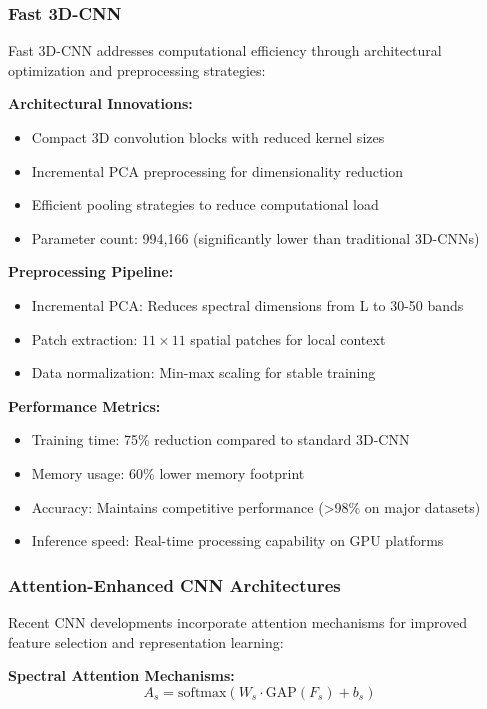 \documentclass[journal]{IEEEtran}
\begin{document}
\subsubsection{Fast 3D-CNN}

Fast 3D-CNN \cite{ahmad2021fast} addresses computational efficiency through architectural optimization and preprocessing strategies:

\textbf{Architectural Innovations:}
\begin{itemize}
\item Compact 3D convolution blocks with reduced kernel sizes
\item Incremental PCA preprocessing for dimensionality reduction
\item Efficient pooling strategies to reduce computational load
\item Parameter count: 994,166 (significantly lower than traditional 3D-CNNs)
\end{itemize}

\textbf{Preprocessing Pipeline:}
\begin{itemize}
\item Incremental PCA: Reduces spectral dimensions from L to 30-50 bands
\item Patch extraction: $11 \times 11$ spatial patches for local context
\item Data normalization: Min-max scaling for stable training
\end{itemize}

\textbf{Performance Metrics:}
\begin{itemize}
\item Training time: 75\% reduction compared to standard 3D-CNN
\item Memory usage: 60\% lower memory footprint
\item Accuracy: Maintains competitive performance (>98\% on major datasets)
\item Inference speed: Real-time processing capability on GPU platforms
\end{itemize}

\subsubsection{Attention-Enhanced CNN Architectures}

Recent CNN developments incorporate attention mechanisms for improved feature selection and representation learning:

\textbf{Spectral Attention Mechanisms:}
\begin{equation}
A_s = \text{softmax}(W_s \cdot \text{GAP}(F_s) + b_s)
\end{equation}
\end{document}
